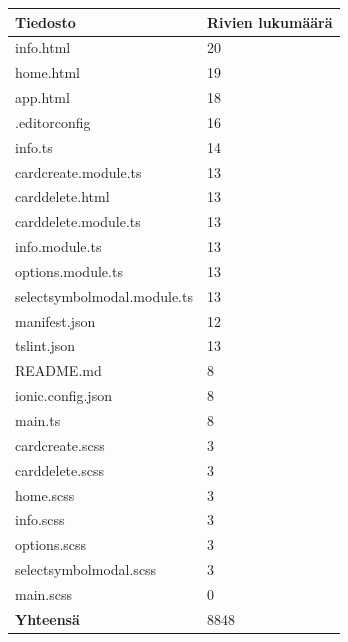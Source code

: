 \documentclass[utf8]{gradu3}
\begin{document}
\begin{center}
    \begin{tabular}{ | l | l |}
    \hline
    \textbf{Tiedosto} & \textbf{Rivien lukumäärä} \\ \hline
    info.html & 20 \\ \hline
    home.html & 19 \\ \hline
    app.html & 18 \\ \hline
    .editorconfig & 16 \\ \hline
    info.ts & 14 \\ \hline
    cardcreate.module.ts & 13 \\ \hline
    carddelete.html & 13 \\ \hline
    carddelete.module.ts & 13 \\ \hline
    info.module.ts & 13 \\ \hline
    options.module.ts & 13 \\ \hline
    selectsymbolmodal.module.ts & 13 \\ \hline
    manifest.json & 12 \\ \hline
    tslint.json & 13 \\ \hline
    README.md & 8 \\ \hline
    ionic.config.json & 8 \\ \hline
    main.ts & 8 \\ \hline
    cardcreate.scss & 3 \\ \hline
    carddelete.scss & 3 \\ \hline
    home.scss & 3 \\ \hline
    info.scss & 3 \\ \hline
    options.scss & 3 \\ \hline
    selectsymbolmodal.scss & 3 \\ \hline
    main.scss & 0 \\ \hline
    \textbf{Yhteensä} & 8848 \\
    \hline
    \end{tabular}
\end{center}
\end{document}
